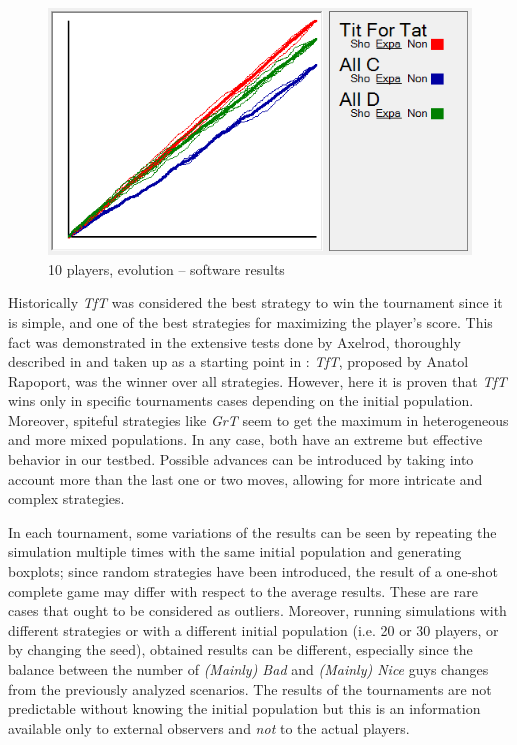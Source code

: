 \documentclass[journal,10pt,twoside]{IEEEtran}
\begin{document}
\begin{figure}[!ht]
    \centering
    \includegraphics[width=.7\columnwidth]{../img/ipdmp/ipdmp10-plot-det}
    \caption{10 players, evolution -- software results \cite{demosw}}
    \label{fig:ipdmp10evosw}
\end{figure}

Historically \textit{TfT} was considered the best strategy to win the tournament since it is simple, and one of the best strategies for maximizing the player's score.
This fact was demonstrated in the extensive tests done by Axelrod, thoroughly described in \cite{axelrod1981evolution,axelrod1984evolution} and taken up as a starting point in \cite{mathieu2017}: \textit{TfT}, proposed by Anatol Rapoport, was the winner over all strategies.
However, here it is proven that \textit{TfT} wins only in specific tournaments cases depending on the initial population. Moreover, spiteful strategies like \textit{GrT} seem to get the maximum in heterogeneous and more mixed populations. In any case, both have an extreme but effective behavior in our testbed. Possible advances can be introduced by taking into account more than the last one or two moves, allowing for more intricate and complex strategies.~\cite{mathieu2017}

In each tournament, some variations of the results can be seen by repeating the simulation multiple times with the same initial population and generating boxplots; since random strategies have been introduced, the result of a one-shot complete game may differ with respect to the average results. These are rare cases that ought to be considered as outliers. Moreover, running simulations with different strategies or with a different initial population (i.e. 20 or 30 players, or by changing the seed), obtained results can be different, especially since the balance between the number of \textit{(Mainly) Bad} and \textit{(Mainly) Nice} guys changes from the previously analyzed scenarios. The results of the tournaments are not predictable without knowing the initial population but this is an information available only to external observers and \textit{not} to the actual players. 
\end{document}
